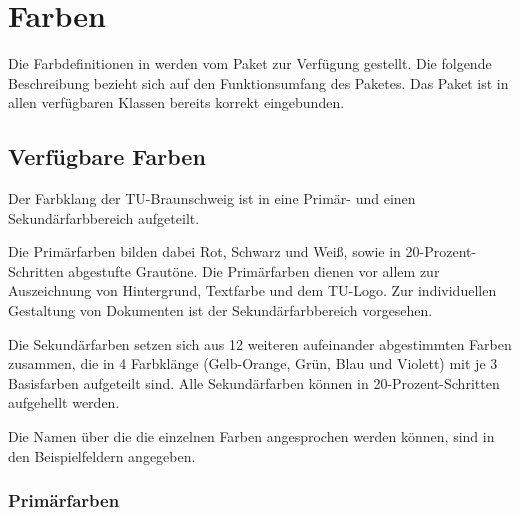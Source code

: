 \chapter{Farben}\label{chap:tubscolors}

\newcommand{\classoptionitem}[1][ ]{
  \item[\mdseries{\ttfamily%
    \textbackslash usepackage%
    {[{\color{tuRed}#1}]}%
    \{tubslogo\}}]\hfill\\
}

Die Farbdefinitionen in \tubslatex werden vom Paket 
zur Verfügung gestellt. Die folgende Beschreibung bezieht sich
auf den Funktionsumfang des Paketes. Das Paket ist in allen verfügbaren
Klassen bereits korrekt eingebunden.

\newcommand{\rainbow}[2][\relax]{{\noindent\sffamily\footnotesize%
\ifx#1\relax\colorlet{fglbg}{black}\else\colorlet{fglbg}{#1}\fi
\colorbox{#2100}{\hbox to 0.188\textwidth{%
  \color{fglbg}\vphantom{Fg}#2{}100\hfill}}%
\colorbox{#280}{\hbox to 0.188\textwidth{%
  \color{fglbg}\vphantom{Fg}#2{}80\hfill}}%
\colorbox{#260}{\hbox to 0.188\textwidth{\vphantom{Fg}#2{}60\hfill}}%
\colorbox{#240}{\hbox to 0.188\textwidth{\vphantom{Fg}#2{}40\hfill}}%
\colorbox{#220}{\hbox to 0.188\textwidth{\vphantom{Fg}#2{}20\hfill}}\\%
}}

\section{Verfügbare Farben}

Der Farbklang der TU-Braunschweig ist in eine Primär- und einen
Sekundärfarbbereich aufgeteilt.

Die Primärfarben bilden dabei Rot, Schwarz und Weiß, sowie in
20-Prozent-Schritten abgestufte Grautöne. Die Primärfarben dienen
vor allem zur Auszeichnung von Hintergrund, Textfarbe und dem TU-Logo.
Zur individuellen Gestaltung von Dokumenten ist der Sekundärfarbbereich
vorgesehen.

Die Sekundärfarben setzen sich aus 12 weiteren aufeinander abgestimmten
Farben zusammen, die 
in 4 Farbklänge (Gelb-Orange, Grün, Blau und Violett) mit je 3 Basisfarben
aufgeteilt sind.
Alle Sekundärfarben können in 20-Prozent-Schritten aufgehellt werden.

Die Namen über die die einzelnen Farben angesprochen werden können, sind in den
Beispielfeldern angegeben.

\subsection{Primärfarben}

